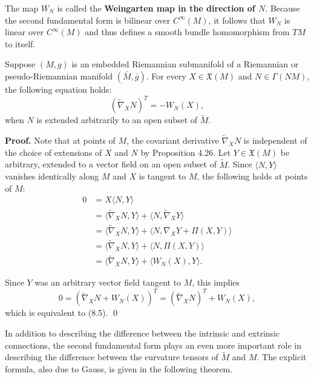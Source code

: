The map $W_N$ is called the \textbf{Weingarten map in the direction of $N$}. Because the second fundamental form is bilinear over $C^\infty(M)$, it follows that $W_N$ is linear over $C^\infty(M)$ and thus defines a smooth bundle homomorphism from $TM$ to itself.

\begin{proposition}
\label{prop:weingarten-equation}

Suppose $(M,g)$ is an embedded Riemannian submanifold of a Riemannian or pseudo-Riemannian manifold $(\bar{M}, \bar{g})$. For every $X \in \mathfrak{X}(M)$ and $N \in \Gamma(NM)$, the following equation holds:
\begin{equation}
(\widetilde{\nabla}_X N)^T = -W_N(X),
\tag{8.5}
\end{equation}
when $N$ is extended arbitrarily to an open subset of $\widetilde{M}$.
\end{proposition}

\noindent\textbf{Proof.} Note that at points of $M$, the covariant derivative $\widetilde{\nabla}_X N$ is independent of the choice of extensions of $X$ and $N$ by Proposition 4.26. Let $Y \in \mathfrak{X}(M)$ be arbitrary, extended to a vector field on an open subset of $\widetilde{M}$. Since $\langle N, Y \rangle$ vanishes identically along $M$ and $X$ is tangent to $M$, the following holds at points of $M$:
\begin{align*}
0 &= X\langle N, Y \rangle\\
&= \langle \widetilde{\nabla}_X N, Y \rangle + \langle N, \widetilde{\nabla}_X Y \rangle\\
&= \langle \widetilde{\nabla}_X N, Y \rangle + \langle N, \nabla_X Y + \Pi(X,Y) \rangle\\
&= \langle \widetilde{\nabla}_X N, Y \rangle + \langle N, \Pi(X,Y) \rangle\\
&= \langle \widetilde{\nabla}_X N, Y \rangle + \langle W_N(X), Y \rangle.
\end{align*}

Since $Y$ was an arbitrary vector field tangent to $M$, this implies
\[
0 = (\widetilde{\nabla}_X N + W_N(X))^T = (\widetilde{\nabla}_X N)^T + W_N(X),
\]
which is equivalent to (8.5). \qed

In addition to describing the difference between the intrinsic and extrinsic connections, the second fundamental form plays an even more important role in describing the difference between the curvature tensors of $\widetilde{M}$ and $M$. The explicit formula, also due to Gauss, is given in the following theorem.

